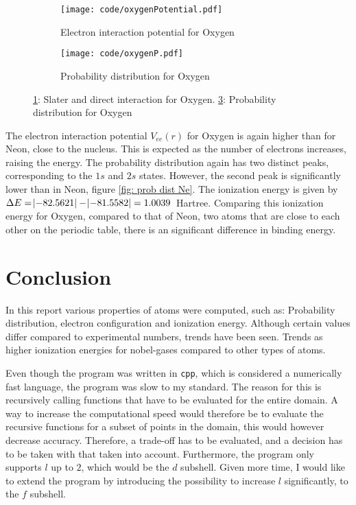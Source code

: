 \documentclass[a4paper]{article}
\newcommand{\newparagraph}{\vspace{.5cm}\noindent}
\begin{document}
\begin{figure}[H]
    \begin{subfigure}{0.45\textwidth}
        \centering
        \texttt{[image: code/oxygenPotential.pdf]}
        \caption{Electron interaction potential for Oxygen}
        \label{fig: vEE C}
    \end{subfigure}
    \hfill
    \begin{subfigure}{0.45\textwidth}
        \centering
        \texttt{[image: code/oxygenP.pdf]}
        \caption{Probability distribution for Oxygen}
        \label{fig: Prob dist C}
    \end{subfigure}
    \caption{\ref{fig: vEE C}: Slater and direct interaction for Oxygen. \ref{fig: Prob dist C}: Probability distribution for Oxygen}
\end{figure}\noindent
The electron interaction potential $V_{ee}(r)$ for Oxygen is again higher than for Neon, close to the nucleus. This is expected as the number of electrons increases, raising the energy. The probability distribution again has two distinct peaks, corresponding to the $1s$ and $2s$ states. However, the second peak is significantly lower than in Neon, figure \ref{fig: prob dist Ne}. The ionization energy is given by $\Delta E = \abs{-82.5621} - \abs{-81.5582} = 1.0039$~Hartree. Comparing this ionization energy for Oxygen, compared to that of Neon, two atoms that are close to each other on the periodic table, there is an significant difference in binding energy.
\section{Conclusion}
In this report various properties of atoms were computed, such as: Probability distribution, electron configuration and ionization energy. Although certain values differ compared to experimental numbers, trends have been seen. Trends as higher ionization energies for nobel-gases compared to other types of atoms. 

\newparagraph
Even though the program was written in \verb|cpp|, which is considered a numerically fast language, the program was slow to my standard. The reason for this is recursively calling functions that have to be evaluated for the entire domain. A way to increase the computational speed would therefore be to evaluate the recursive functions for a subset of points in the domain, this would however decrease accuracy. Therefore, a trade-off has to be evaluated, and a decision has to be taken with that taken into account.
Furthermore, the program only supports $l$ up to $2$, which would be the $d$ subshell. Given more time, I would like to extend the program by introducing the possibility to increase $l$ significantly, to the $f$ subshell. 
\end{document}
